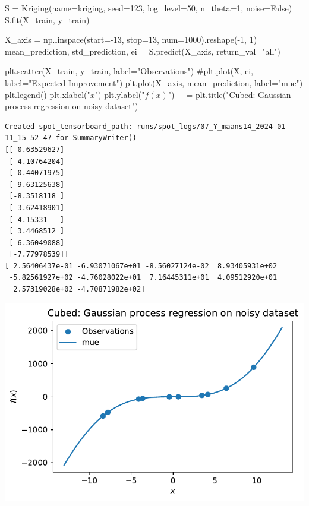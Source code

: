 \documentclass[
  letterpaper,
  DIV=11,
  numbers=noendperiod]{scrreprt}
\newenvironment{Shaded}{\begin{snugshade}}{\end{snugshade}}
\newcommand{\CommentTok}[1]{\textcolor[rgb]{0.37,0.37,0.37}{#1}}
\newcommand{\DecValTok}[1]{\textcolor[rgb]{0.68,0.00,0.00}{#1}}
\newcommand{\NormalTok}[1]{\textcolor[rgb]{0.00,0.23,0.31}{#1}}
\newcommand{\OperatorTok}[1]{\textcolor[rgb]{0.37,0.37,0.37}{#1}}
\newcommand{\StringTok}[1]{\textcolor[rgb]{0.13,0.47,0.30}{#1}}
\newcommand{\VariableTok}[1]{\textcolor[rgb]{0.07,0.07,0.07}{#1}}
\begin{document}
\begin{Shaded}
\begin{Highlighting}[]
\NormalTok{S }\OperatorTok{=}\NormalTok{ Kriging(name}\OperatorTok{=}\StringTok{\textquotesingle{}kriging\textquotesingle{}}\NormalTok{,  seed}\OperatorTok{=}\DecValTok{123}\NormalTok{, log\_level}\OperatorTok{=}\DecValTok{50}\NormalTok{, n\_theta}\OperatorTok{=}\DecValTok{1}\NormalTok{, noise}\OperatorTok{=}\VariableTok{False}\NormalTok{)}
\NormalTok{S.fit(X\_train, y\_train)}

\NormalTok{X\_axis }\OperatorTok{=}\NormalTok{ np.linspace(start}\OperatorTok{={-}}\DecValTok{13}\NormalTok{, stop}\OperatorTok{=}\DecValTok{13}\NormalTok{, num}\OperatorTok{=}\DecValTok{1000}\NormalTok{).reshape(}\OperatorTok{{-}}\DecValTok{1}\NormalTok{, }\DecValTok{1}\NormalTok{)}
\NormalTok{mean\_prediction, std\_prediction, ei }\OperatorTok{=}\NormalTok{ S.predict(X\_axis, return\_val}\OperatorTok{=}\StringTok{"all"}\NormalTok{)}

\NormalTok{plt.scatter(X\_train, y\_train, label}\OperatorTok{=}\StringTok{"Observations"}\NormalTok{)}
\CommentTok{\#plt.plot(X, ei, label="Expected Improvement")}
\NormalTok{plt.plot(X\_axis, mean\_prediction, label}\OperatorTok{=}\StringTok{"mue"}\NormalTok{)}
\NormalTok{plt.legend()}
\NormalTok{plt.xlabel(}\StringTok{"$x$"}\NormalTok{)}
\NormalTok{plt.ylabel(}\StringTok{"$f(x)$"}\NormalTok{)}
\NormalTok{\_ }\OperatorTok{=}\NormalTok{ plt.title(}\StringTok{"Cubed: Gaussian process regression on noisy dataset"}\NormalTok{)}
\end{Highlighting}
\end{Shaded}

\begin{verbatim}
Created spot_tensorboard_path: runs/spot_logs/07_Y_maans14_2024-01-11_15-52-47 for SummaryWriter()
[[ 0.63529627]
 [-4.10764204]
 [-0.44071975]
 [ 9.63125638]
 [-8.3518118 ]
 [-3.62418901]
 [ 4.15331   ]
 [ 3.4468512 ]
 [ 6.36049088]
 [-7.77978539]]
[ 2.56406437e-01 -6.93071067e+01 -8.56027124e-02  8.93405931e+02
 -5.82561927e+02 -4.76028022e+01  7.16445311e+01  4.09512920e+01
  2.57319028e+02 -4.70871982e+02]
\end{verbatim}

\includegraphics{012_num_spot_ei_files/figure-pdf/cell-53-output-2.pdf}
\end{document}
